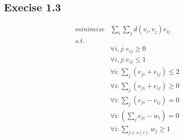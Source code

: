 \documentclass[11pt,a4paper]{article}
\begin{document}
\subsection{Execise 1.3}
\begin{align*}
    minimize & \sum_i \sum_j d(v_i, v_j) e_{ij} \\
    s.t.     & \\
             & \forall i, j: e_{ij} \geq 0 \\
             & \forall i, j: e_{ij} \leq 1 \\
             & \forall i: \sum_j (e_{ji} + e_{ij}) \leq 2 \\
             & \forall i: \sum_j (e_{ji} + e_{ij}) \geq 0 \\
             & \forall i: \sum_j (e_{ji} - e_{ij}) = 0 \\
             & \forall i: (\sum_j e_{ji} - w_i) = 0 \\
             & \forall i: \sum_{j \in v(i)} w_j \geq 1 \\
\end{align*}



\end{document}

